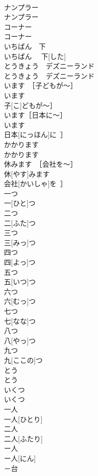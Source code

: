 \documentclass[8pt]{extreport}
\begin{document}
\begin{CJK}{UTF8}{min}
\\	ナンプラー	
\\	ナンプラー	
\\	コーナー	
\\	コーナー	
\\	いちばん　下	
\\	いちばん　 下[した]	
\\	とうきょう　デズニーランド	
\\	とうきょう　デズニーランド	
\\	います　［子どもが〜］	
\\	います　
\\	子[こ]どもが〜］	
\\	います［日本に～］	
\\	います
\\	日本[にっほん]に~］	
\\	かかります	
\\	かかります	
\\	休みます　［会社を～］	
\\	休[やす]みます　
\\	会社[かいしゃ]を~］	
\\	一つ	
\\	一[ひと]つ	
\\	二つ	
\\	二[ふた]つ	
\\	三つ	
\\	三[みっ]つ	
\\	四つ	
\\	四[よっ]つ	
\\	五つ	
\\	五[いつ]つ	
\\	六つ	
\\	六[むっ]つ	
\\	七つ	
\\	七[なな]つ	
\\	八つ	
\\	八[やっ]つ	
\\	九つ	
\\	九[ここの]つ	
\\	とう	
\\	とう	
\\	いくつ	
\\	いくつ	
\\	一人	
\\	一人[ひとり]	
\\	二人	
\\	二人[ふたり]	
\\	ー人	
\\	ー人[にん]	
\\	－台	

\end{CJK}
\end{document}
